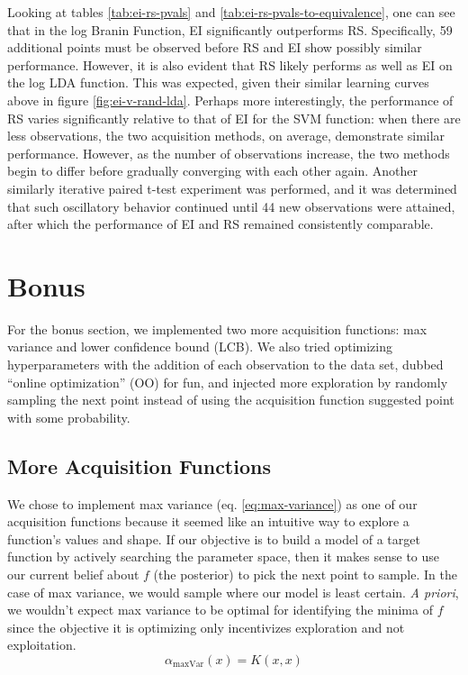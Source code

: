 \documentclass[11pt]{article}
\numberwithin{equation}{section}
\begin{document}
Looking at tables \ref{tab:ei-rs-pvals} and \ref{tab:ei-rs-pvals-to-equivalence}, one can see that in the log Branin Function, EI significantly outperforms RS. Specifically, 59 additional points must be observed before RS and EI show possibly similar performance.
However, it is also evident that RS likely performs as well as EI on the log LDA function. This was expected, given their similar learning curves above in figure \ref{fig:ei-v-rand-lda}.
Perhaps more interestingly, the performance of RS varies significantly relative to that of EI for the SVM function: when there are less observations, the two acquisition methods, on average, demonstrate similar performance. However, as the number of observations increase, the two methods begin to differ before gradually converging with each other again. Another similarly iterative paired t-test experiment was performed, and it was determined that such oscillatory behavior continued until 44 new observations were attained, after which the performance of EI and RS remained consistently comparable.

\section{Bonus}
For the bonus section, we implemented two more acquisition functions: max
variance and lower confidence bound (LCB). We also tried optimizing hyperparameters with the addition of each observation to the data set, dubbed ``online optimization'' (OO) for fun, and injected more exploration by randomly sampling the next point instead of using the acquisition function suggested point with some probability.

\subsection*{More Acquisition Functions}
We chose to implement max variance (eq. \ref{eq:max-variance}) as one of our
acquisition functions because it seemed like an intuitive way to explore a
function's values and shape. If our objective is to build a model of a target
function by actively searching the parameter space, then it makes sense to
use our current belief about $f$ (the posterior) to pick the next point to
sample. In the case of max variance, we would sample where our model is least
certain. \emph{A priori}, we wouldn't expect max variance to be optimal for
identifying the minima of $f$ since the objective it is optimizing only
incentivizes exploration and not exploitation.
\begin{equation}
  \alpha_{\max \text{Var}}(x) = K(x, x)
  \label{eq:max-variance}
\end{equation}
\end{document}
